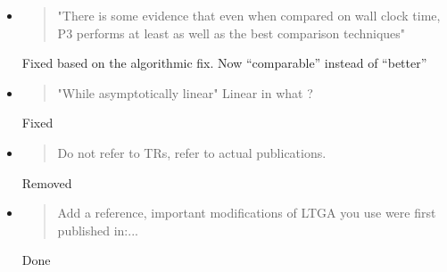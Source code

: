 \documentclass[]{article}
\begin{document}
\begin{itemize}
\item
\begin{quote}
 "There is some evidence that even when compared on wall clock time, P3 performs at least as well as the best comparison techniques"
\end{quote}

Fixed based on the algorithmic fix. Now ``comparable'' instead of ``better''

\item
\begin{quote}
"While asymptotically linear"   Linear in what ?
\end{quote}

Fixed

\item
\begin{quote}
 Do not refer to TRs, refer to actual publications.
\end{quote}

Removed

\item
\begin{quote}
Add a reference, important modifications of LTGA you use were first published in:...
\end{quote}

Done
\end{itemize}
\end{document}
